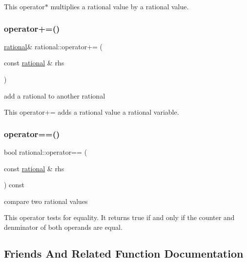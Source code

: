 This operator$\ast$ multiplies a rational value by a rational value. \mbox{\label{classrational_a9b83ad0c803d2ac242b42e71d954a356}} 
\subsubsection{\texorpdfstring{operator+=()}{operator+=()}}
{\footnotesize\ttfamily \hyperlink{classrational}{rational}\& rational\+::operator+= (\begin{DoxyParamCaption}\item[{const \hyperlink{classrational}{rational} \&}]{rhs }\end{DoxyParamCaption})\hspace{0.3cm}{\ttfamily [inline]}}



add a rational to another rational 

This operator+= adds a rational value a rational variable. \mbox{\label{classrational_a8b565720ea15ddfb17ea202e27698478}} 
\subsubsection{\texorpdfstring{operator==()}{operator==()}}
{\footnotesize\ttfamily bool rational\+::operator== (\begin{DoxyParamCaption}\item[{const \hyperlink{classrational}{rational} \&}]{rhs }\end{DoxyParamCaption}) const\hspace{0.3cm}{\ttfamily [inline]}}



compare two rational values 

This operator tests for equality. It returns true if and only if the counter and denminator of both operands are equal. 

\subsection{Friends And Related Function Documentation}
\mbox{\label{classrational_a5b7c78fca4537715369ba7da02abb4df}} 
